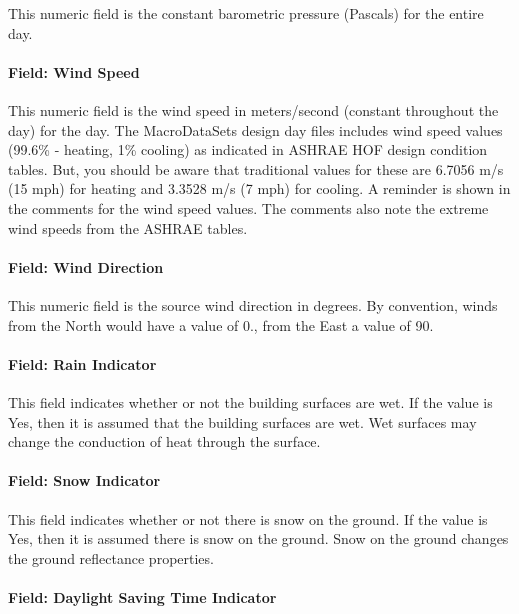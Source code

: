 This numeric field is the constant barometric pressure (Pascals) for the entire day.

\paragraph{Field: Wind Speed}\label{field-wind-speed}

This numeric field is the wind speed in meters/second (constant throughout the day) for the day. The MacroDataSets design day files includes wind speed values (99.6\% - heating, 1\% cooling) as indicated in ASHRAE HOF design condition tables. But, you should be aware that traditional values for these are 6.7056 m/s (15 mph) for heating and 3.3528 m/s (7 mph) for cooling. A reminder is shown in the comments for the wind speed values. The comments also note the extreme wind speeds from the ASHRAE tables.

\paragraph{Field: Wind Direction}\label{field-wind-direction}

This numeric field is the source wind direction in degrees. By convention, winds from the North would have a value of 0., from the East a value of 90.

\paragraph{Field: Rain Indicator}\label{field-rain-indicator}

This field indicates whether or not the building surfaces are wet. If the value is Yes, then it is assumed that the building surfaces are wet. Wet surfaces may change the conduction of heat through the surface.

\paragraph{Field: Snow Indicator}\label{field-snow-indicator}

This field indicates whether or not there is snow on the ground. If the value is Yes, then it is assumed there is snow on the ground. Snow on the ground changes the ground reflectance properties.

\paragraph{Field: Daylight Saving Time Indicator}\label{field-daylight-saving-time-indicator}

